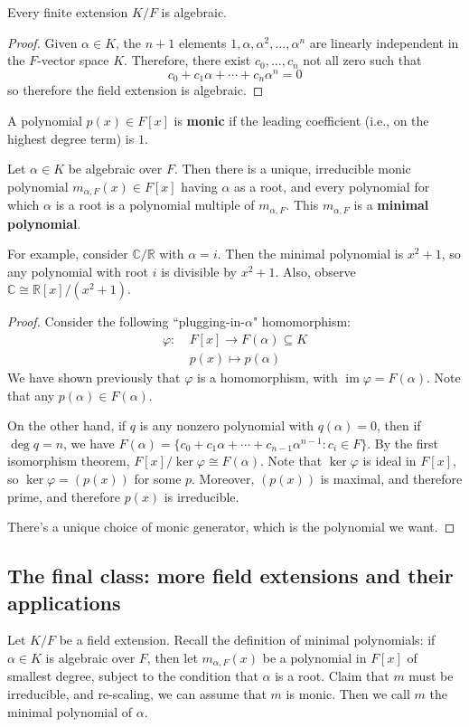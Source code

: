 \documentclass{article}
\theoremstyle{plain}
\newcommand{\R}{\mathbb{R}}
\newcommand{\C}{\mathbb{C}}
\newcommand{\on}[1]{\operatorname{#1}}
\begin{document}
\begin{theorem}{}{}
Every finite extension $K/F$ is algebraic.	
\end{theorem}
\begin{proof}
Given $\alpha \in K$, the $n+1$ elements $1,\alpha,\alpha^2,\ldots,\alpha^n$ are linearly independent in the $F$-vector space $K$. Therefore, there exist $c_0,\ldots,c_n$ not all zero such that $$c_0 + c_1\alpha + \cdots + c_n\alpha^n = 0$$
so therefore the field extension is algebraic.	
\end{proof}
\begin{definition}{}{}
A polynomial $p(x) \in F[x]$ is \textbf{monic} if the leading coefficient (i.e., on the highest degree term) is $1$. 	
\end{definition}
\begin{theorem}{}{}
	Let $\alpha \in K$ be algebraic over $F$. Then there is a unique, irreducible monic polynomial $m_{\alpha,F}(x) \in F[x]$ having $\alpha$ as a root, and every polynomial for which $\alpha$ is a root is a polynomial multiple of $m_{\alpha, F}$. This $m_{\alpha,F}$ is a \textbf{minimal polynomial}.
\end{theorem}
For example, consider $\C/\R$ with $\alpha = i$. Then the minimal polynomial is $x^2 + 1$, so any polynomial with root $i$ is divisible by $x^2+1$. Also, observe $\C \cong \R[x]/(x^2+1)$.
\begin{proof}
Consider the following ``plugging-in-$\alpha$" homomorphism:
	\begin{align*}
	\varphi : \ &F[x] \to F(\alpha) \subseteq K \\
	&p(x) \mapsto p(\alpha)	
	\end{align*}
We have shown previously that $\varphi$ is a homomorphism, with $\on{im}\varphi = F(\alpha)$. Note that any $p(\alpha) \in F(\alpha)$.

On the other hand, if $q$ is any nonzero polynomial with $q(\alpha) = 0$, then if $\on{deg}q = n$, we have $F(\alpha) = \{  c_0 + c_1\alpha + \cdots + c_{n-1}\alpha^{n-1} : c_i \in F\}$. By the first isomorphism theorem, $F[x]/\ker\varphi \cong F(\alpha)$. Note that $\ker\varphi$ is ideal in $F[x]$, so $\ker\varphi=(p(x))$ for some $p$. Moreover, $(p(x))$ is maximal, and therefore prime, and therefore $p(x)$ is irreducible.

There's a unique choice of monic generator, which is the polynomial we want.
\end{proof}

\subsection{The final class: more field extensions and their applications}
Let $K/F$ be a field extension. Recall the definition of minimal polynomials: if $\alpha \in K$ is algebraic over $F$, then let $m_{\alpha,F}(x)$ be a polynomial in $F[x]$ of smallest degree, subject to the condition that $\alpha$ is a root. Claim that $m$ must be irreducible, and re-scaling, we can assume that $m$ is monic. Then we call $m$ the minimal polynomial of $\alpha$.
\end{document}
